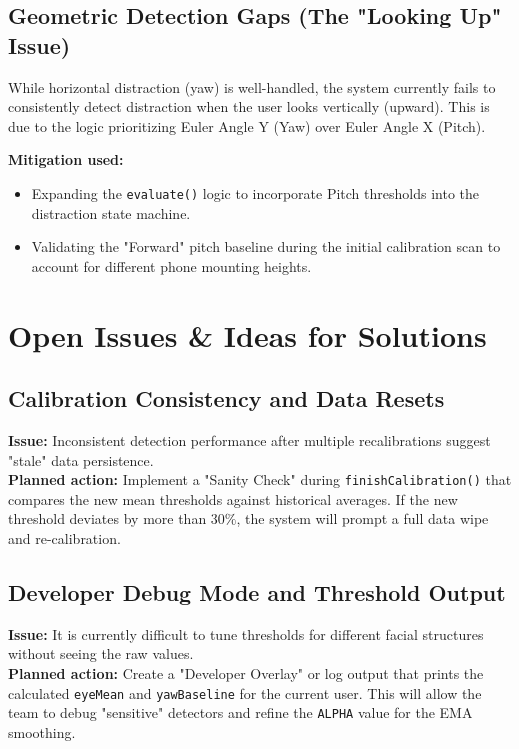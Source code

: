 \documentclass[11pt]{report}
\begin{document}
\subsection{Geometric Detection Gaps (The "Looking Up" Issue)}
While horizontal distraction (yaw) is well-handled, the system currently fails to consistently detect distraction when the user looks vertically (upward). This is due to the logic prioritizing Euler Angle Y (Yaw) over Euler Angle X (Pitch).

\textbf{Mitigation used:}
\begin{itemize}
    \item Expanding the \texttt{evaluate()} logic to incorporate Pitch thresholds into the distraction state machine.
    \item Validating the "Forward" pitch baseline during the initial calibration scan to account for different phone mounting heights.
\end{itemize}

\section{Open Issues \& Ideas for Solutions}

\subsection{Calibration Consistency and Data Resets}
\textbf{Issue:} Inconsistent detection performance after multiple recalibrations suggest "stale" data persistence.\\
\textbf{Planned action:} Implement a "Sanity Check" during \texttt{finishCalibration()} that compares the new mean thresholds against historical averages. If the new threshold deviates by more than $30\%$, the system will prompt a full data wipe and re-calibration.

\subsection{Developer Debug Mode and Threshold Output}
\textbf{Issue:} It is currently difficult to tune thresholds for different facial structures without seeing the raw values.\\
\textbf{Planned action:} Create a "Developer Overlay" or log output that prints the calculated \texttt{eyeMean} and \texttt{yawBaseline} for the current user. This will allow the team to debug "sensitive" detectors and refine the \texttt{ALPHA} value for the EMA smoothing.
\end{document}

